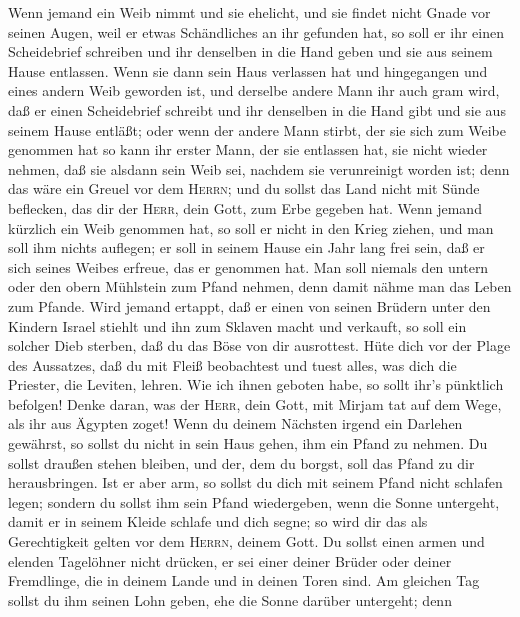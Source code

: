  Wenn jemand ein Weib nimmt und sie ehelicht, und sie
findet nicht Gnade vor seinen Augen, weil er etwas Schändliches an ihr
gefunden hat, so soll er ihr einen Scheidebrief schreiben und ihr
denselben in die Hand geben und sie aus seinem Hause entlassen.
 Wenn sie dann sein Haus verlassen hat und hingegangen und
eines andern Weib geworden ist,  und derselbe andere Mann
ihr auch gram wird, daß er einen Scheidebrief schreibt und ihr denselben
in die Hand gibt und sie aus seinem Hause entläßt; oder wenn der andere
Mann stirbt, der sie sich zum Weibe genommen hat  so kann
ihr erster Mann, der sie entlassen hat, sie nicht wieder nehmen, daß sie
alsdann sein Weib sei, nachdem sie verunreinigt worden ist; denn das
wäre ein Greuel vor dem \textsc{Herrn}; und du sollst das Land nicht mit
Sünde beflecken, das dir der \textsc{Herr}, dein Gott, zum Erbe gegeben
hat.  Wenn jemand kürzlich ein Weib genommen hat, so soll
er nicht in den Krieg ziehen, und man soll ihm nichts auflegen; er soll
in seinem Hause ein Jahr lang frei sein, daß er sich seines Weibes
erfreue, das er genommen hat.  Man soll niemals den untern
oder den obern Mühlstein zum Pfand nehmen, denn damit nähme man das
Leben zum Pfande.  Wird jemand ertappt, daß er einen von
seinen Brüdern unter den Kindern Israel stiehlt und ihn zum Sklaven
macht und verkauft, so soll ein solcher Dieb sterben, daß du das Böse
von dir ausrottest.  Hüte dich vor der Plage des
Aussatzes, daß du mit Fleiß beobachtest und tuest alles, was dich die
Priester, die Leviten, lehren. Wie ich ihnen geboten habe, so sollt
ihr's pünktlich befolgen!  Denke daran, was der
\textsc{Herr}, dein Gott, mit Mirjam tat auf dem Wege, als ihr aus
Ägypten zoget!  Wenn du deinem Nächsten irgend ein
Darlehen gewährst, so sollst du nicht in sein Haus gehen, ihm ein Pfand
zu nehmen.  Du sollst draußen stehen bleiben, und der,
dem du borgst, soll das Pfand zu dir herausbringen.  Ist
er aber arm, so sollst du dich mit seinem Pfand nicht schlafen legen;
 sondern du sollst ihm sein Pfand wiedergeben, wenn die
Sonne untergeht, damit er in seinem Kleide schlafe und dich segne; so
wird dir das als Gerechtigkeit gelten vor dem \textsc{Herrn}, deinem
Gott.  Du sollst einen armen und elenden Tagelöhner nicht
drücken, er sei einer deiner Brüder oder deiner Fremdlinge, die in
deinem Lande und in deinen Toren sind.  Am gleichen Tag
sollst du ihm seinen Lohn geben, ehe die Sonne darüber untergeht; denn
